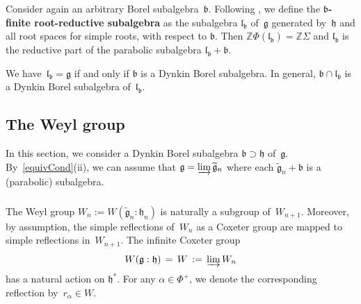 \documentclass[11pt]{amsart}
\newcommand{\rR}{\Phi}
\newcommand{\fg}{\mathfrak{g}}
\newcommand{\fl}{\mathfrak{l}}
\newcommand{\fh}{\mathfrak{h}}
\newcommand{\fb}{\mathfrak{b}}
\newcommand{\mZ}{\mathbb{Z}}
\numberwithin{equation}{section}
\theoremstyle{plain}
\theoremstyle{remark}
\theoremstyle{remark}
\theoremstyle{construction}
\begin{document}

\subsubsection{}Consider again an arbitrary Borel subalgebra~$\fb$. 
Following \cite[Section~6]{NamT}, we define the {\bf $\fb$-finite root-reductive subalgebra} as the subalgebra $\fl_{\fb}$ of~$\fg$ generated by~$\fh$ and all root spaces for simple roots, with respect to $\fb$. Then $\mZ\rR(\fl_{\fb})=\mZ\Sigma $ and $\fl_{\fb}$ is the reductive part of the parabolic subalgebra $\fl_{\fb}+\fb$.

We have~$\fl_{\fb}=\fg$ if and only if $\fb$ is a Dynkin Borel subalgebra. In general, $\fb\cap{\fl_{\fb}}$ is a Dynkin Borel subalgebra of~$\fl_{\fb}$.






\subsection{The Weyl group} In this section, we consider a Dynkin Borel subalgebra $\fb\supset\fh$ of~$\fg$. By~\ref{equivCond}(ii), we can assume that $\fg=\varinjlim\widetilde{\fg}_n$ where each $\widetilde{\fg}_n+\fb$ is a (parabolic) subalgebra. 

\subsubsection{}The Weyl group $W_n:=W(\widetilde{\fg}_n:\fh_n)$ is naturally a subgroup of~$W_{n+1}$. Moreover, by assumption, the simple reflections of~$W_n$ as a Coxeter group are mapped to simple reflections in~$W_{n+1}$. The infinite Coxeter group 
$$W(\fg:\fh)\,=\,W\,:=\,\varinjlim W_n$$ has a natural action on $\fh^\ast$. For any $\alpha\in \Phi^+$, we denote the corresponding reflection by~$r_\alpha\in W$.
\end{document}
